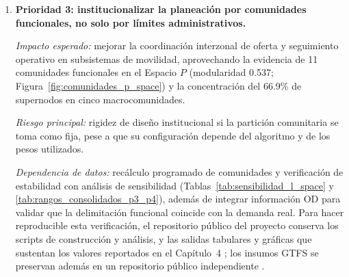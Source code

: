 \begin{enumerate}
    \textit{Riesgo principal:} profundizar la dependencia del hipercentro si la continuidad operativa se dise\~na solo para nodos centrales y no incorpora nodos articuladores perif\'ericos.

    \textit{Dependencia de datos:} monitoreo continuo de incidentes y cumplimiento de servicio por supernodo, junto con recalculo peri\'odico de centralidades para mantener vigente la jerarqu\'ia de criticidad.

    \item \textbf{Prioridad 3: institucionalizar la planeaci\'on por comunidades funcionales, no solo por l\'imites administrativos.}

    \textit{Impacto esperado:} mejorar la coordinaci\'on interzonal de oferta y seguimiento operativo en subsistemas de movilidad, aprovechando la evidencia de 11 comunidades funcionales en el Espacio $P$ (modularidad 0.537; Figura~\ref{fig:comunidades_p_space}) y la concentraci\'on del 66.9\% de supernodos en cinco macrocomunidades.

    \textit{Riesgo principal:} rigidez de dise\~no institucional si la partici\'on comunitaria se toma como fija, pese a que su configuraci\'on depende del algoritmo y de los pesos utilizados.

    \textit{Dependencia de datos:} rec\'alculo programado de comunidades y verificaci\'on de estabilidad con an\'alisis de sensibilidad (Tablas~\ref{tab:sensibilidad_l_space} y \ref{tab:rangos_consolidados_p3_p4}), adem\'as de integrar informaci\'on OD para validar que la delimitaci\'on funcional coincide con la demanda real. Para hacer reproducible esta verificaci\'on, el repositorio p\'ublico del proyecto conserva los scripts de construcci\'on y an\'alisis, y las salidas tabulares y gr\'aficas que sustentan los valores reportados en el Cap\'itulo~4 \cite{betancourt_tesis_repo2026}; los insumos GTFS se preservan adem\'as en un repositorio p\'ublico independiente \cite{betancourt_gtfs_amg2024}.
\end{enumerate}
